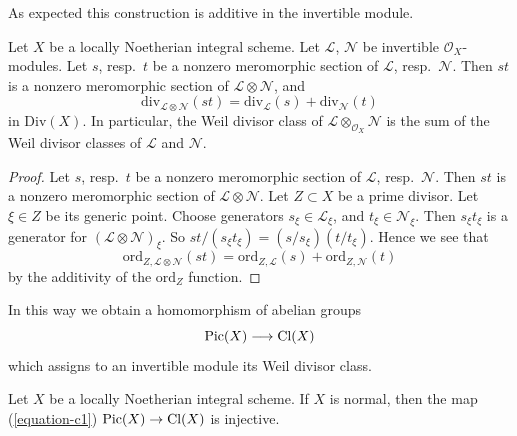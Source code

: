 \noindent
As expected this construction is additive in the invertible module.

\begin{lemma}
\label{lemma-c1-additive}
Let $X$ be a locally Noetherian integral scheme.
Let $\mathcal{L}$, $\mathcal{N}$ be invertible $\mathcal{O}_X$-modules.
Let $s$, resp.\ $t$ be a nonzero meromorphic section
of $\mathcal{L}$, resp.\ $\mathcal{N}$. Then $st$ is a nonzero
meromorphic section of $\mathcal{L} \otimes \mathcal{N}$, and
$$
\text{div}_{\mathcal{L} \otimes \mathcal{N}}(st)
=
\text{div}_\mathcal{L}(s) + \text{div}_\mathcal{N}(t)
$$
in $\text{Div}(X)$. In particular, the Weil divisor class of
$\mathcal{L} \otimes_{\mathcal{O}_X} \mathcal{N}$ is the sum
of the Weil divisor classes of $\mathcal{L}$ and $\mathcal{N}$.
\end{lemma}

\begin{proof}
Let $s$, resp.\ $t$ be a nonzero meromorphic section
of $\mathcal{L}$, resp.\ $\mathcal{N}$. Then $st$ is a nonzero
meromorphic section of $\mathcal{L} \otimes \mathcal{N}$.
Let $Z \subset X$ be a prime divisor. Let $\xi \in Z$ be its generic
point. Choose generators $s_\xi \in \mathcal{L}_\xi$, and
$t_\xi \in \mathcal{N}_\xi$. Then $s_\xi t_\xi$ is a generator
for $(\mathcal{L} \otimes \mathcal{N})_\xi$.
So $st/(s_\xi t_\xi) = (s/s_\xi)(t/t_\xi)$.
Hence we see that
$$
\text{ord}_{Z, \mathcal{L} \otimes \mathcal{N}}(st)
=
\text{ord}_{Z, \mathcal{L}}(s) + \text{ord}_{Z, \mathcal{N}}(t)
$$
by the additivity of the $\text{ord}_Z$ function.
\end{proof}

\noindent
In this way we obtain a homomorphism of abelian groups
\begin{equation}
\label{equation-c1}
\mathop{\mathrm{Pic}}\nolimits(X) \longrightarrow \text{Cl}(X)
\end{equation}
which assigns to an invertible module its Weil divisor class.

\begin{lemma}
\label{lemma-normal-c1-injective}
Let $X$ be a locally Noetherian integral scheme. If $X$ is normal,
then the map (\ref{equation-c1}) $\mathop{\mathrm{Pic}}\nolimits(X) \to \text{Cl}(X)$
is injective.
\end{lemma}

